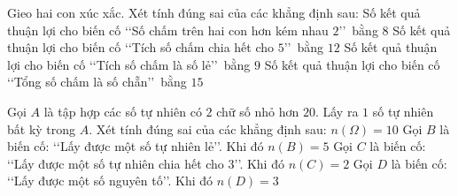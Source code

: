 \begin{ex}%
	Gieo hai con xúc xắc. Xét tính  đúng sai của các khẳng định sau:
	 \choiceTF
		{\True Số kết  quả thuận lợi cho biến cố \lq\lq Số chấm trên hai con hơn kém nhau $2$\rq\rq\, bằng $8$}
		{Số kết quả thuận  lợi cho biến cố \lq\lq Tích số chấm chia hết cho $5$\rq\rq\, bằng $12$}
		{\True Số kết quả thuận lợi cho biến cố \lq\lq Tích số chấm là  số lẻ\rq\rq\, bằng $9$}
		{Số kết quả thuận lợi cho biến cố \lq\lq Tổng số chấm là số chẵn\rq\rq\,  bằng $15$}
\end{ex}

\begin{ex}%
	Gọi $A$ là tập hợp các số  tự nhiên có $2$ chữ số nhỏ hơn $20$. Lấy ra $1$ số tự nhiên bất kỳ trong $A$. Xét tính đúng sai của các khẳng định sau:
	\choiceTF 
		 {\True $n(\Omega)=10$}
		{\True Gọi  $B$ là biến cố: \lq\lq Lấy được một số tự nhiên lẻ\rq\rq. Khi đó $n(B)=5$}
		{Gọi $C$ là biến cố: \lq\lq Lấy được một số tự nhiên chia hết cho $3$\rq\rq. Khi đó $n(C)=2$} 
		{Gọi $D$ là biến cố: \lq\lq Lấy được một số  nguyên tố\rq\rq. Khi đó $n(D)=3$}
\end{ex}

